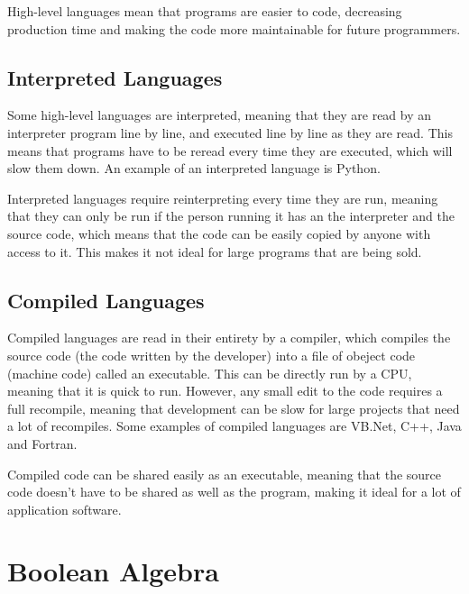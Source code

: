         High-level languages mean that programs are easier to code, decreasing production time and making the code more maintainable for future programmers.

    \subsection{Interpreted Languages}
        Some high-level languages are interpreted, meaning that they are read by an interpreter program line by line, and executed line by line as they are read.
        This means that programs have to be reread every time they are executed, which will slow them down.
        An example of an interpreted language is Python.

        Interpreted languages require reinterpreting every time they are run, meaning that they can only be run if the person running it has an the interpreter and the source code, which means that the code can be easily copied by anyone with access to it.
        This makes it not ideal for large programs that are being sold.

    \subsection{Compiled Languages}
        Compiled languages are read in their entirety by a compiler, which compiles the source code (the code written by the developer) into a file of obeject code (machine code) called an executable.
        This can be directly run by a CPU, meaning that it is quick to run.
        However, any small edit to the code requires a full recompile, meaning that development can be slow for large projects that need a lot of recompiles.
        Some examples of compiled languages are VB.Net, C++, Java and Fortran.

        Compiled code can be shared easily as an executable, meaning that the source code doesn't have to be shared as well as the program, making it ideal for a lot of application software.

    \newpage

    \section{Boolean Algebra}
